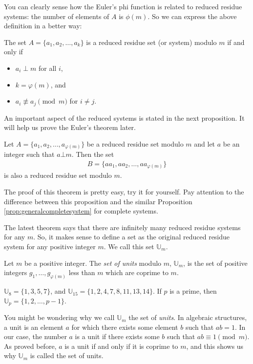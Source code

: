 \documentclass{subfile}
\begin{document}
	You can clearly sense how the Euler's phi function is related to reduced residue systems: the number of elements of $A$ is $\phi(m)$. So we can express the above definition in a better way:
	
	
	\begin{proposition}
		The set $A=\{a_1, a_2, \ldots, a_k\}$ is a reduced residue set (or system) modulo $m$ if and only if
		\begin{itemize}
			\item $a_i \perp m$ for all $i$,
			\item $k=\varphi(m)$, and
			\item $a_i \not \equiv a_j \pmod m$ for $i \neq j$.
		\end{itemize}
	\end{proposition}
	
	An important aspect of the reduced systems is stated in the next proposition. It will help us prove the Euler's theorem later.	
	
	\begin{proposition}\label{prop:generalreducedsystem} 
		Let $A=\{a_1, a_2, \ldots, a_{\varphi(m)}\}$ be a reduced residue set modulo $m$ and let $a$ be an integer such that $a \bot m$. Then the set
		\begin{align*}
			B=\{aa_1, aa_2, \ldots, aa_{\varphi(m)}\}
		\end{align*}
		is also a reduced residue set modulo $m$.
	\end{proposition}
	
	The proof of this theorem is pretty easy, try it for yourself. Pay attention to the difference between this proposition and the similar Proposition \ref{prop:generalcompletesystem} for complete systems. 
	

	The latest theorem says that there are infinitely many reduced residue systems for any $m$. So, it makes sense to define a set as the original reduced residue system for any positive integer $m$. We call this set $\mathbb U_m$.
	
	\begin{definition}\label{def:setofunits}
		Let $m$ be a positive integer. The \textit{set of units} modulo $m$, $\mathbb U_m$, is the set of positive integers $g_1,\ldots,g_{\varphi(m)}$ less than $m$ which are coprime to $m$. 
	\end{definition}
	
	\begin{example}
		$\mathbb U_8=\{1,3,5,7\}$, and $\mathbb U_{15}=\{1,2,4,7,8,11,13,14\}$. If $p$ is a prime, then $\mathbb U_p=\{1,2,\ldots, p-1\}$.
	\end{example}

	
	You might be wondering why we call $\mathbb U_m$ the set of \textit{units}. In algebraic structures, a unit is an element $a$ for which there exists some element $b$ such that $ab=1$. In our case, the number $a$ is a unit if there exists some $b$ such that $ab \equiv 1 \pmod m$. As proved before, $a$ is a unit if and only if it is coprime to $m$, and this shows us why $\mathbb U_m$ is called the set of units.
	
\end{document}
